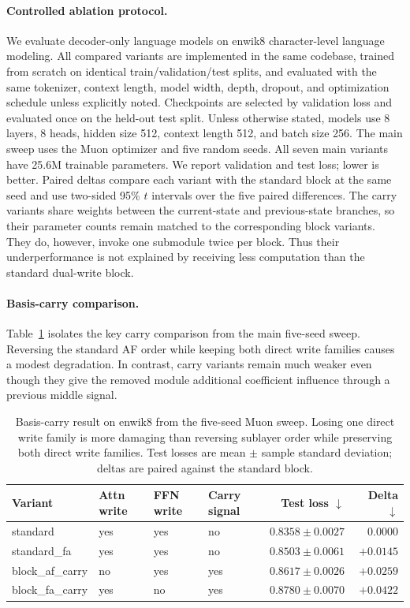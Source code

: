 \documentclass[letterpaper]{article}
\begin{document}
\paragraph{Controlled ablation protocol.}
We evaluate decoder-only language models on enwik8 character-level language
modeling. All compared variants are implemented in the same codebase, trained
from scratch on identical train/validation/test splits, and evaluated with the
same tokenizer, context length, model width, depth, dropout, and optimization
schedule unless explicitly noted. Checkpoints are selected by validation loss
and evaluated once on the held-out test split. Unless otherwise stated, models
use 8 layers, 8 heads, hidden size 512, context length 512, and batch size 256.
The main sweep uses the Muon optimizer and five random seeds. All seven main
variants have 25.6M trainable parameters. We report validation and test loss;
lower is better. Paired deltas compare each variant with the standard block at
the same seed and use two-sided 95\% $t$ intervals over the five paired
differences. The carry variants share weights between the current-state and
previous-state branches, so their parameter counts remain matched to the
corresponding block variants. They do, however, invoke one submodule twice per
block. Thus their underperformance is not explained by receiving less
computation than the standard dual-write block.

\paragraph{Basis-carry comparison.}
Table~\ref{tab:basis-carry} isolates the key carry comparison from the main
five-seed sweep. Reversing the standard AF order while keeping both direct
write families causes a modest degradation. In contrast, carry variants remain
much weaker even though they give the removed module additional coefficient
influence through a previous middle signal.

\begin{table}[t]
\centering
\caption{Basis-carry result on enwik8 from the five-seed Muon sweep. Losing one
direct write family is more damaging than reversing sublayer order while
preserving both direct write families. Test losses are mean $\pm$ sample
standard deviation; deltas are paired against the standard block.}
\label{tab:basis-carry}
\begin{tabular}{llllrr}
\toprule
Variant & Attn write & FFN write & Carry signal & Test loss $\downarrow$ & Delta $\downarrow$ \\
\midrule
standard & yes & yes & no & $0.8358 \pm 0.0027$ & $0.0000$ \\
standard\_fa & yes & yes & no & $0.8503 \pm 0.0061$ & $+0.0145$ \\
block\_af\_carry & no & yes & yes & $0.8617 \pm 0.0026$ & $+0.0259$ \\
block\_fa\_carry & yes & no & yes & $0.8780 \pm 0.0070$ & $+0.0422$ \\
\bottomrule
\end{tabular}
\end{table}
\end{document}
